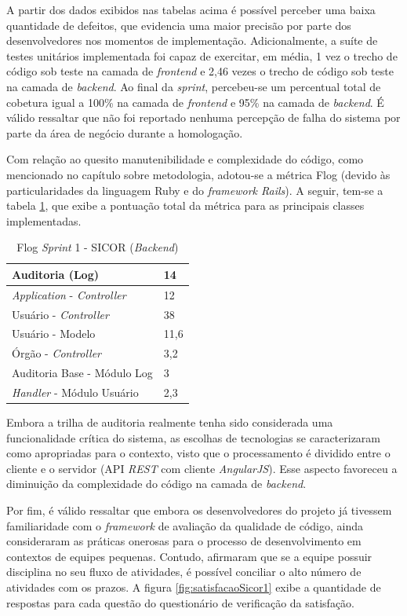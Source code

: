 A partir dos dados exibidos nas tabelas acima é possível perceber uma baixa quantidade de defeitos, que evidencia uma maior precisão por parte dos desenvolvedores nos momentos de implementação. Adicionalmente, a suíte de testes unitários implementada foi capaz de exercitar, em média, 1 vez o trecho de código sob teste na camada de \textit{frontend} e 2,46 vezes o trecho de código sob teste na camada de \textit{backend}. Ao final da \textit{sprint}, percebeu-se um percentual total de cobetura igual a 100\% na camada de \textit{frontend} e 95\% na camada de \textit{backend}. É válido ressaltar que não foi reportado nenhuma percepção de falha do sistema por parte da área de negócio durante a homologação.

Com relação ao quesito manutenibilidade e complexidade do código, como mencionado no capítulo sobre metodologia, adotou-se a métrica Flog (devido às particularidades da linguagem Ruby e do \textit{framework Rails}). A seguir, tem-se a tabela \ref{table:tabela9}, que exibe a pontuação total da métrica para as principais classes implementadas.

\begin{table}[h]
\caption{Flog \textit{Sprint} 1 - SICOR (\textit{Backend})}
\centering
\begin{tabular}{ | m{12cm} | m{4cm} | } 
\hline
Auditoria (Log) & 14 \\ 
\hline
\textit{Application} - \textit{Controller} & 12 \\ 
\hline
Usuário - \textit{Controller} & 38 \\ 
\hline
Usuário - Modelo & 11,6 \\ 
\hline
Órgão - \textit{Controller} & 3,2 \\
\hline
Auditoria Base - Módulo Log & 3 \\
\hline
\textit{Handler} - Módulo Usuário & 2,3 \\
\hline
\end{tabular}
\label{table:tabela9}
\end{table}

\clearpage

Embora a trilha de auditoria realmente tenha sido considerada uma funcionalidade crítica do sistema, as escolhas de tecnologias se caracterizaram como apropriadas para o contexto, visto que o processamento é dividido entre o cliente e o servidor (API \textit{REST} com cliente \textit{AngularJS}). Esse aspecto favoreceu a diminuição da complexidade do código na camada de \textit{backend}.

Por fim, é válido ressaltar que embora os desenvolvedores do projeto já tivessem familiaridade com o \textit{framework} de avaliação da qualidade de código, ainda consideraram as práticas onerosas para o processo de desenvolvimento em contextos de equipes pequenas. Contudo, afirmaram que se a equipe possuir disciplina no seu fluxo de atividades, é possível conciliar o alto número de atividades com os prazos. A figura \ref{fig:satisfacaoSicor1} exibe a quantidade de respostas para cada questão do questionário de verificação da satisfação.

